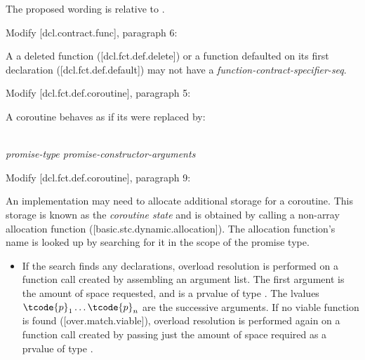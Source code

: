 The proposed wording is relative to \cite{P2900R8}.

Modify [dcl.contract.func], paragraph 6:
\begin{adjustwidth}{0.5cm}{0.5cm}
A a deleted function ([dcl.fct.def.delete])\removed{,} or a function defaulted on its first declaration ([dcl.fct.def.default]) may not have a \emph{function-contract-specifier-seq}.
\end{adjustwidth}

Modify [dcl.fct.def.coroutine], paragraph 5:
\begin{adjustwidth}{0.5cm}{0.5cm}
A coroutine behaves as if its  were replaced by: 

\phantom{~~~}\tcode{\{} \\
\phantom{~~~~~~}\emph{promise-type  promise-constructor-arguments} \tcode{;} \\
\phantom{~~~~~~}\tcode{[...]}
\end{adjustwidth}

Modify [dcl.fct.def.coroutine], paragraph 9:
\begin{adjustwidth}{0.5cm}{0.5cm}
An implementation may need to allocate additional storage for a coroutine. This storage is known as the \emph{coroutine state} and is obtained by calling a non-array allocation function ([basic.stc.dynamic.allocation]). The allocation function's name is looked up by searching for it in the scope of the promise type.
\begin{itemize}
\item{If the search finds any declarations,
overload resolution is performed on a function call created by assembling an
argument list. The first argument is the amount of space requested, and
is a prvalue of type .
The lvalues $\tcode{p}_1 \dotsc \tcode{p}_n$  are the successive arguments.
If no viable function is found ([over.match.viable]),
overload resolution is performed again
on a function call created by passing just
the amount of space required as a prvalue of type .
}
\end{itemize}
\end{adjustwidth}

